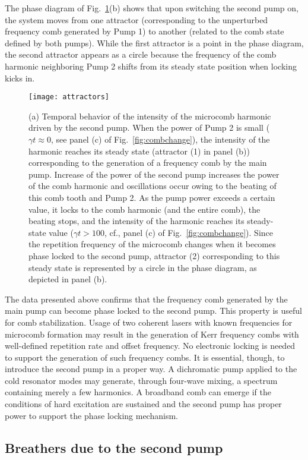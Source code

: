 The phase diagram of Fig.~\ref{fig:attractors}(b) shows that upon switching the second pump on, the system moves from one attractor (corresponding to the unperturbed frequency comb generated by Pump 1) to another (related to the comb state defined by both pumps). While the first attractor is a point in the phase diagram, the second attractor appears as a circle because the frequency of the comb harmonic neighboring Pump 2 shifts from its steady state position when locking kicks in.
%
\begin{figure}[tbp]
  \centering
  \texttt{[image: attractors]}
\caption{ \small (a) Temporal behavior of the intensity of the microcomb harmonic driven by the second pump. When the power of Pump 2 is small ($\gamma t \approx 0$, see panel (c) of Fig.~\ref{fig:combchange}), the intensity of the harmonic reaches its steady state (attractor (1) in panel (b)) corresponding to the generation of a frequency comb by the main pump. Increase of the power of the second pump increases the power of the comb harmonic and oscillations occur owing to the beating of this comb tooth and Pump 2. As the pump power exceeds a certain value, it locks to the comb harmonic (and the entire comb), the beating stops, and the intensity of the harmonic reaches its steady-state value ($\gamma t > 100$, cf., panel (c) of Fig.~\ref{fig:combchange}). Since the repetition frequency of the microcomb changes when it becomes phase locked to the second pump, attractor (2) corresponding to this steady state is represented by a circle in the phase diagram, as depicted in panel (b).
} \label{fig:attractors}
\end{figure}
%

The data presented above confirms that the frequency comb generated by the main pump can become phase locked to the second pump. This property is useful for comb stabilization. Usage of two coherent lasers with known frequencies for microcomb formation may result in the generation of Kerr frequency combs with well-defined repetition rate and offset frequency. No electronic locking is needed to support the generation of such frequency combs. It is essential, though, to introduce the second pump in a proper way. A dichromatic pump applied to the cold resonator modes may generate, through four-wave mixing, a spectrum containing merely a few harmonics. A broadband comb can emerge if the conditions of hard excitation are sustained and the second pump has proper power to support the phase locking mechanism.

\subsection{Breathers due to the second pump}

